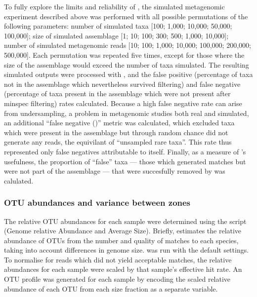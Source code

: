 To fully explore the limits and reliability of , the simulated metagenomic experiment described above was performed with all possible permutations of the following parameters: number of simulated taxa [100; 1,000; 10,000; 50,000; 100,000]; size of simulated assemblage [1; 10; 100; 300; 500; 1,000; 10,000]; number of simulated metagenomic reads [10; 100; 1,000; 10,000; 100,000; 200,000; 500,000].
Each permutation was repeated five times, except for those where the size of the assemblage would exceed the number of taxa simulated.
The resulting simulated  outputs were processed with , and the false positive (percentage of taxa not in the assemblage which nevertheless survived  filtering) and false negative (percentage of taxa present in the assemblage which were not present after minspec filtering) rates calculated.
Because a high false negative rate can arise from undersampling, a problem in metagenomic studies both real and simulated, an additional ``false negative ()'' metric was calculated, which excluded taxa which were present in the assemblage but through random chance did not generate any reads, the equivilant of ``unsampled rare taxa''.
This rate thus represented only false negatives attributable to  itself.
Finally, as a measure of 's usefulness, the proportion of ``false'' taxa --- those which generated  matches but were not part of the assemblage --- that were succesfully removed by  was calulated.

\subsubsection{\ac{OTU} abundances and variance between zones}

The relative \ac{OTU} abundances for each sample were determined using the  script  (Genome relative Abundance and Average Size)\cite{Angly:2009ip}.
Briefly,  estimates the relative abundance of \acp{OTU} from the number and quality of  matches to each species, taking into account differences in genome size. 
 was run with the default settings. 
To normalise for reads which did not yield acceptable matches, the relative abundances for each sample were scaled by that sample's effective  hit rate. 
An \ac{OTU} profile was generated for each sample by encoding the scaled relative abundance of each \ac{OTU} from each size fraction as a separate variable.

